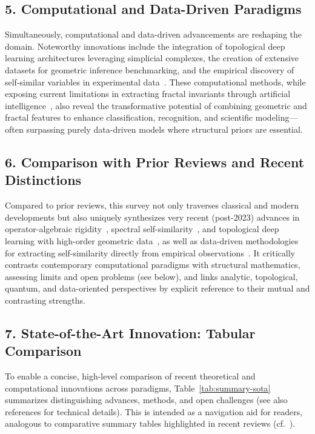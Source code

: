 \documentclass[sigconf]{acmart}
\begin{document}
\subsection*{5. Computational and Data-Driven Paradigms}

Simultaneously, computational and data-driven advancements are reshaping the domain. Noteworthy innovations include the integration of topological deep learning architectures leveraging simplicial complexes, the creation of extensive datasets for geometric inference benchmarking, and the empirical discovery of self-similar variables in experimental data~\cite{ref60,ref101}. These computational methods, while exposing current limitations in extracting fractal invariants through artificial intelligence~\cite{ref44}, also reveal the transformative potential of combining geometric and fractal features to enhance classification, recognition, and scientific modeling---often surpassing purely data-driven models where structural priors are essential.

\subsection*{6. Comparison with Prior Reviews and Recent Distinctions}

Compared to prior reviews, this survey not only traverses classical and modern developments but also uniquely synthesizes very recent (post-2023) advances in operator-algebraic rigidity~\cite{ref52}, spectral self-similarity~\cite{ref54}, and topological deep learning with high-order geometric data~\cite{ref26}, as well as data-driven methodologies for extracting self-similarity directly from empirical observations~\cite{ref65}. It critically contrasts contemporary computational paradigms with structural mathematics, assessing limits and open problems (see below), and links analytic, topological, quantum, and data-oriented perspectives by explicit reference to their mutual and contrasting strengths.

\subsection*{7. State-of-the-Art Innovation: Tabular Comparison}

To enable a concise, high-level comparison of recent theoretical and computational innovations across paradigms, Table~\ref{tab:summary-sota} summarizes distinguishing advances, methods, and open challenges (see also references for technical details). This is intended as a navigation aid for readers, analogous to comparative summary tables highlighted in recent reviews (cf.~\cite{ref5,ref26,ref52}).
\end{document}
